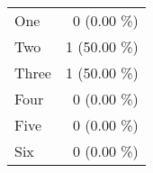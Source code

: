 \begin{tabular}{ l  r }
One & 0 (0.00 \%)\\
Two & 1 (50.00 \%)\\
Three & 1 (50.00 \%)\\
Four & 0 (0.00 \%)\\
Five & 0 (0.00 \%)\\
Six & 0 (0.00 \%)\\
\end{tabular}